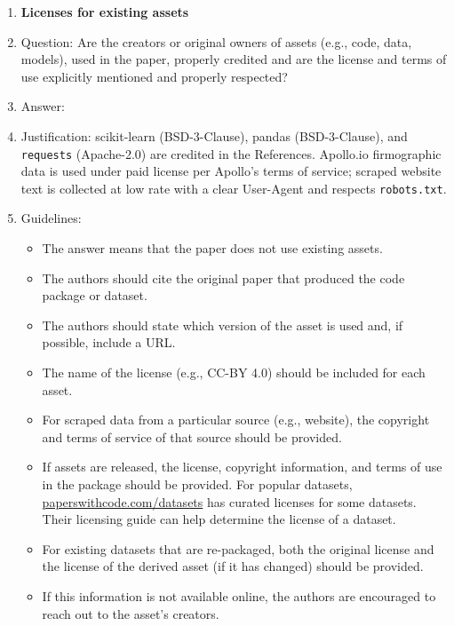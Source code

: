 \documentclass{article}
\begin{document}
\begin{enumerate}
\item {\bf Licenses for existing assets}
    \item[] Question: Are the creators or original owners of assets (e.g., code, data, models), used in the paper, properly credited and are the license and terms of use explicitly mentioned and properly respected?
    \item[] Answer: \answerYes{}
    \item[] Justification: scikit-learn (BSD-3-Clause), pandas (BSD-3-Clause), and \texttt{requests} (Apache-2.0) are credited in the References. Apollo.io firmographic data is used under paid license per Apollo's terms of service; scraped website text is collected at low rate with a clear User-Agent and respects \texttt{robots.txt}.
    \item[] Guidelines:
    \begin{itemize}
        \item The answer \answerNA{} means that the paper does not use existing assets.
        \item The authors should cite the original paper that produced the code package or dataset.
        \item The authors should state which version of the asset is used and, if possible, include a URL.
        \item The name of the license (e.g., CC-BY 4.0) should be included for each asset.
        \item For scraped data from a particular source (e.g., website), the copyright and terms of service of that source should be provided.
        \item If assets are released, the license, copyright information, and terms of use in the package should be provided. For popular datasets, \url{paperswithcode.com/datasets} has curated licenses for some datasets. Their licensing guide can help determine the license of a dataset.
        \item For existing datasets that are re-packaged, both the original license and the license of the derived asset (if it has changed) should be provided.
        \item If this information is not available online, the authors are encouraged to reach out to the asset's creators.
    \end{itemize}


\end{enumerate}
\end{document}
